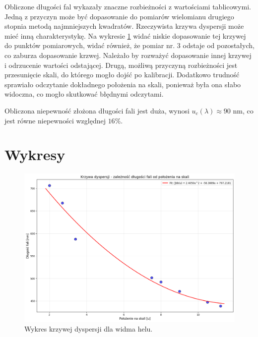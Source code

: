 \documentclass[a4paper,12pt]{article}
\begin{document}
Obliczone długości fal wykazały znaczne rozbieżności z wartościami tablicowymi.
Jedną z przyczyn może być dopasowanie do pomiarów wielomianu drugiego stopnia metodą najmniejszych kwadratów. Rzeczywista krzywa dyspersji może mieć inną charakterystykę. Na wykresie \ref{fig:helium_dispersion} widać niskie dopasowanie tej krzywej do punktów pomiarowych, widać również, że pomiar nr. 3 odstaje od pozostałych, co zaburza dopasowanie krzwej. Należało by rozważyć dopasowanie innej krzywej i odrzucenie wartości odstającej.
Drugą, możliwą przyczyną rozbieżności jest przesunięcie skali, do którego mogło dojść po kalibracji.
Dodatkowo trudność sprawiało odczytanie dokładnego położenia na skali, ponieważ była ona słabo widoczna, co mogło skutkować błędnymi odczytami.


Obliczona niepewność złożona długości fali jest duża, wynosi $u_c(\lambda) \approx 90 \text{ nm}$, co jest równe niepewności względnej $16\%$.


\section{Wykresy}

\begin{figure}[H]
    \centering
    \includegraphics[width=1.3\textwidth,height=0.9\textheight,keepaspectratio,angle=90]{../images/helium_dispersion.png}
    \caption{Wykres krzywej dyspersji dla widma helu.}
    \label{fig:helium_dispersion}
\end{figure}




\end{document}
